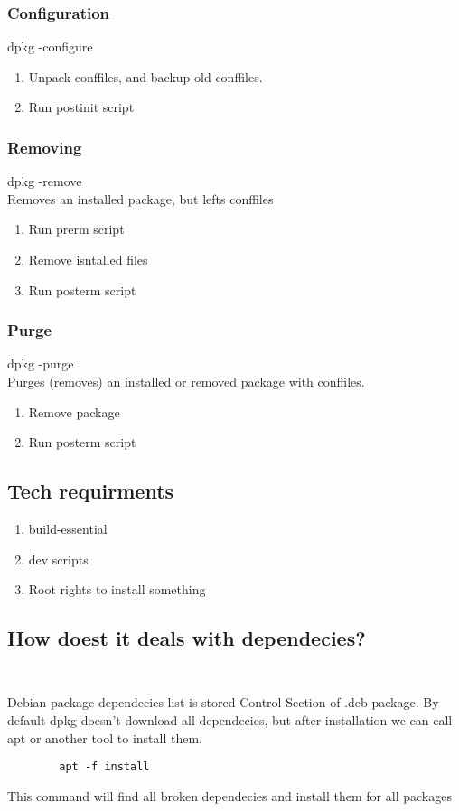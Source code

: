\documentclass[10pt]{article}
\begin{document}
        \subsubsection*{Configuration}
        dpkg -configure
        \begin{enumerate}[label=\arabic*,ref=\theenumi]
            \item Unpack conffiles, and backup old conffiles.
            \item Run postinit script
        \end{enumerate}

        \subsubsection*{Removing}
        dpkg -remove \\
        Removes an installed package, but lefts conffiles
        \begin{enumerate}[label=\arabic*,ref=\theenumi]
            \item Run prerm script
            \item Remove isntalled files
            \item Run posterm script
        \end{enumerate}

        \subsubsection*{Purge}
        dpkg -purge \\
        Purges (removes) an installed or removed package with conffiles.
        \begin{enumerate}[label=\arabic*,ref=\theenumi]
            \item Remove package
            \item Run posterm script
        \end{enumerate}
        \subsection{Tech requirments}
        \begin{enumerate}
        \item build-essential
        \item dev scripts
        \item Root rights to install something
        \end{enumerate}

    \subsection {How doest it deals with dependecies? \\ \\}
    Debian package dependecies list is stored Control Section of .deb package.
    By default dpkg doesn't download all dependecies, but after installation we can call apt or another tool to install them.
    \begin{verbatim}
        apt -f install
    \end{verbatim}
    This command will find all broken dependecies and install them for all packages
\end{document}
